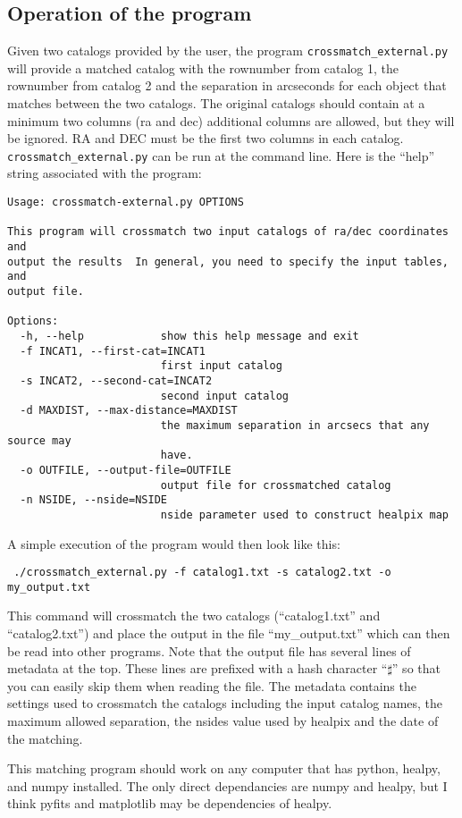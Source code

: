 \documentclass[useAMS,usenatbib,usegraphicx]{article}
\begin{document}
\subsection*{Operation of the program}\label{crossmatch_program_operation}
Given two catalogs provided by the user, the program \texttt{crossmatch\_external.py} will provide a matched catalog with the rownumber from catalog 1, the rownumber from catalog 2 and the separation in arcseconds for each object that matches between the two catalogs. The original catalogs should contain at a minimum two columns (ra and dec) additional columns are allowed, but they will be ignored. RA and DEC must be the first two columns in each catalog. \texttt{crossmatch\_external.py} can be run at the command line. Here is the ``help'' string associated with the program:\\
\begin{verbatim}
Usage: crossmatch-external.py OPTIONS

This program will crossmatch two input catalogs of ra/dec coordinates  and
output the results  In general, you need to specify the input tables, and
output file.

Options:
  -h, --help            show this help message and exit
  -f INCAT1, --first-cat=INCAT1
                        first input catalog
  -s INCAT2, --second-cat=INCAT2
                        second input catalog
  -d MAXDIST, --max-distance=MAXDIST
                        the maximum separation in arcsecs that any source may
                        have.
  -o OUTFILE, --output-file=OUTFILE
                        output file for crossmatched catalog
  -n NSIDE, --nside=NSIDE
                        nside parameter used to construct healpix map
\end{verbatim} 

A simple execution of the program would then look like this:
\begin{verbatim}
 ./crossmatch_external.py -f catalog1.txt -s catalog2.txt -o my_output.txt 
\end{verbatim}
This command will crossmatch the two catalogs (``catalog1.txt'' and ``catalog2.txt'') and place the output in the file ``my\_output.txt'' which can then be read into other programs. Note that the output file has several lines of metadata at the top. These lines are prefixed with a hash character ``$\sharp$'' so that you can easily skip them when reading the file. The metadata contains the settings used to crossmatch the catalogs including the input catalog names, the maximum allowed separation, the nsides value used by healpix and the date of the matching.

This matching program should work on any computer that has python, healpy, and numpy installed. The only direct dependancies are numpy and healpy, but I think pyfits and matplotlib may be dependencies of healpy. 
\end{document}
